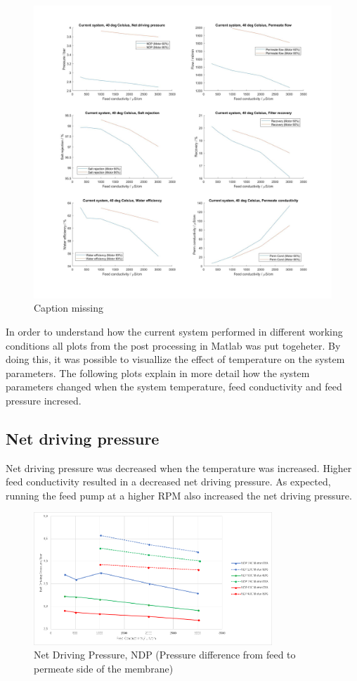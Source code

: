 \begin{figure}[H]
    \centering
    \includegraphics[width=1.1\textwidth]{Key40}
    \caption{Caption missing}
    \label{fig:K40}
\end{figure}

\newpage

In order to understand how the current system performed in different working conditions all plots from the post processing in Matlab was put togeheter. By doing this, it was possible to visuallize the effect of temperature on the system parameters. The following plots explain in more detail how the system parameters changed when the system temperature, feed conductivity and feed pressure incresed.  

\subsection{Net driving pressure}

Net driving pressure was decreased when the temperature was increased. Higher feed conductivity resulted in a decreased net driving pressure. As expected, running the feed pump at a higher RPM also increased the net driving pressure.

\begin{figure}[H]
    \centering
    \includegraphics[width=0.8\textwidth]{NDP}
    \caption{Net Driving Pressure, NDP (Pressure difference from feed to permeate side of the membrane)}
    \label{fig:NDP}
\end{figure}


